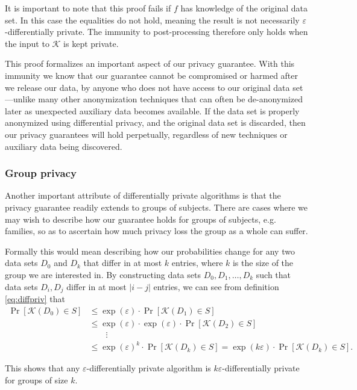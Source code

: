 \documentclass[12pt]{article}
\newcommand{\fancy}{\mathcal}
\renewcommand{\epsilon}{\varepsilon}
\begin{document}
It is important to note that this proof fails if $f$ has knowledge of the original data set. In this case the equalities do not hold, meaning the result is not necessarily $\epsilon$-differentially private. The immunity to post-processing therefore only holds when the input to $\fancy{K}$ is kept private. \bigskip

This proof formalizes an important aspect of our privacy guarantee. With this immunity we know that our guarantee cannot be compromised or harmed after we release our data, by anyone who does not have access to our original data set---unlike many other anonymization techniques that can often be de-anonymized later as unexpected auxiliary data becomes available. If the data set is properly anonymized using differential privacy, and the original data set is discarded, then our privacy guarantees will hold perpetually, regardless of new techniques or auxiliary data being discovered.

\subsubsection{Group privacy}

Another important attribute of differentially private algorithms is that the privacy guarantee readily extends to groups of subjects. There are cases where we may wish to describe how our guarantee holds for groups of subjects, e.g. families, so as to ascertain how much privacy loss the group as a whole can suffer.

Formally this would mean describing how our probabilities change for any two data sets $D_0$ and $D_k$ that differ in at most $k$ entries, where $k$ is the size of the group we are interested in. By constructing data sets $D_0, D_1, \dots, D_k$ such that data sets $D_i,D_j$ differ in at most $|i-j|$ entries, we can see from definition \ref{eq:diffpriv} that
\begin{align*}
    \Pr[\fancy{K}(D_0) \in S] &\leq \exp(\epsilon) \cdot \Pr[\fancy{K}(D_1) \in S] \\
        &\leq \exp(\epsilon) \cdot \exp(\epsilon) \cdot \Pr[\fancy{K}(D_2) \in S] \\
        &\qquad\vdots \\
        &\leq \exp(\epsilon)^k \cdot \Pr[\fancy{K}(D_k) \in S] = \exp(k\epsilon) \cdot \Pr[\fancy{K}(D_k) \in S].
\end{align*}

This shows that any $\epsilon$-differentially private algorithm is $k\epsilon$-differentially private for groups of size $k$. \bigskip
\end{document}
